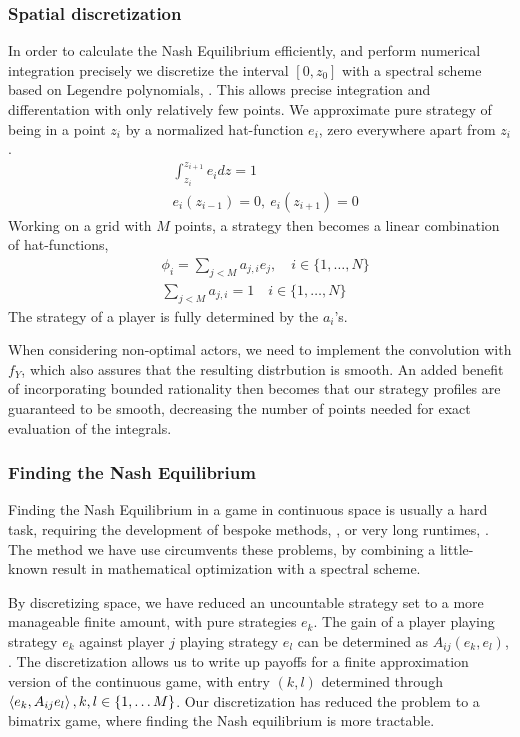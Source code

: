 \subsubsection*{Spatial discretization}
In order to calculate the Nash Equilibrium efficiently, and perform numerical integration precisely we discretize the interval $[0,z_0]$ with a spectral scheme based on Legendre polynomials, \citep{kopriva2009implementing}. This allows precise integration and differentation with only relatively few points.
We approximate pure strategy of being in a point $z_i$  by a normalized hat-function $e_i$, zero everywhere apart from $z_i$.
\begin{align*}
	& \int_{z_i}^{z_{i+1}} e_i dz = 1 \\
	&e_i(z_{i-1}) = 0,~ e_i(z_{i+1}) = 0
\end{align*}
Working on a grid with $M$ points, a strategy then becomes a linear combination of hat-functions,
\begin{align*}
  &\phi_{i} = \sum_{j<M} a_{j,i} e_j, \quad i\in \{1,\dots, N\} \\
  &\sum_{j<M} a_{j,i} = 1 \quad i\in \{1,\dots, N\}
\end{align*}
The strategy of a player is fully determined by the $a_i$'s.

When considering non-optimal actors, we need to implement the convolution with $f_Y$, which also assures that the resulting distrbution is smooth. An added benefit of incorporating bounded rationality then becomes that our strategy profiles are guaranteed to be smooth, decreasing the number of points needed for exact evaluation of the integrals.


\subsubsection*{Finding the Nash Equilibrium}
Finding the Nash Equilibrium in a game in continuous space is usually a hard task, requiring the development of bespoke methods, \citep{verticalmigration}, or very long runtimes, \citep{jerome}. The method we have use circumvents these problems, by combining a little-known result in mathematical optimization with a spectral scheme.

By discretizing space, we have reduced an uncountable strategy set to a more manageable finite amount, with pure strategies $e_k$. The gain of a player playing strategy $e_k$ against player $j$ playing strategy $e_l$ can be determined as $A_{ij}(e_k,e_l)$, . The discretization allows us to write up payoffs for a finite approximation version of the continuous game,  with entry $(k,l)$ determined through $\left \langle e_k,A_{ij}e_l \right \rangle, k,l \in \{1,\dots M\}$.
Our discretization has reduced the problem to a bimatrix game, where finding the Nash equilibrium is more tractable.

